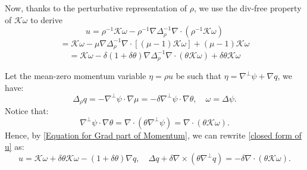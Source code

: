\documentclass[12pt,letterpaper]{article}
\theoremstyle{plain}
\begin{document}
Now, thanks to the perturbative representation of $\rho$, we use the div-free property of $\mathcal K\omega$ to derive
\begin{equation*}
u=\rho^{-1}\mathcal K\omega-\rho^{-1}\nabla\Delta_{\rho}^{-1}\nabla\cdot(\rho^{-1}\mathcal K\omega)   
\end{equation*}
\begin{equation*}
=  \mathcal K\omega-\mu\nabla\Delta_{\rho}^{-1}\nabla\cdot[(\mu-1)\mathcal K\omega]+(\mu-1)\mathcal K\omega  
\end{equation*}
\begin{equation}\label{closed form of u}
 = \mathcal K\omega-\delta(1+\delta \theta)\nabla\Delta_{\rho}^{-1}\nabla\cdot(\theta\mathcal K\omega)+\delta\theta \mathcal K\omega
\end{equation}

Let the mean-zero momentum variable $\eta=\rho u$ be such that $\eta=\nabla^\perp\psi+\nabla q$, we have:
\begin{equation}\label{Equation for Grad part of Momentum}
\Delta_\rho q=-\nabla^\perp\psi\cdot\nabla\mu=-\delta\nabla^\perp\psi\cdot\nabla \theta ,\quad \omega=\Delta\psi . 
\end{equation}
Notice that:
\begin{equation*}
\nabla^\perp\psi\cdot\nabla \theta =\nabla\cdot(\theta\nabla^\perp\psi)=\nabla\cdot(\theta\mathcal K\omega).   
\end{equation*}
Hence, by \eqref{Equation for Grad part of Momentum}, we can rewrite \eqref{closed form of u} as:
\begin{equation}\label{Compact perturbative formula for u}
 u=  \mathcal K\omega +\delta\theta \mathcal K\omega-(1+\delta\theta)\nabla q,\quad \Delta q+\delta\nabla\times( \theta \nabla^\perp q)=-\delta\nabla\cdot(\theta\mathcal K\omega).
\end{equation}
\end{document}
